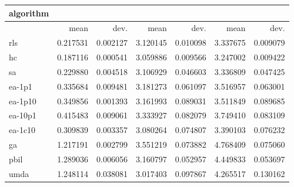 \begin{tabular}{@{}l*{6}{>{{}}N{1}{2}}@{}}
\toprule
{algorithm} &  &  &  \\
\midrule
& {mean} & {dev.} & {mean} & {dev.} & {mean} & {dev.} \\
\midrule
rls & 0.217531 & 0.002127 & 3.120145 & 0.010098 & 3.337675 & 0.009079 \\
 hc & 0.187116 & 0.000541 & 3.059886 & 0.009566 & 3.247002 & 0.009422 \\
 sa & 0.229880 & 0.004518 & 3.106929 & 0.046603 & 3.336809 & 0.047425 \\
 ea-1p1 & 0.335684 & 0.009481 & 3.181273 & 0.061097 & 3.516957 & 0.063001 \\
 ea-1p10 & 0.349856 & 0.001393 & 3.161993 & 0.089031 & 3.511849 & 0.089685 \\
 ea-10p1 & 0.415483 & 0.009061 & 3.333927 & 0.082079 & 3.749410 & 0.083109 \\
 ea-1c10 & 0.309839 & 0.003357 & 3.080264 & 0.074807 & 3.390103 & 0.076232 \\
 ga & 1.217191 & 0.002799 & 3.551219 & 0.073882 & 4.768409 & 0.075060 \\
 pbil & 1.289036 & 0.006056 & 3.160797 & 0.052957 & 4.449833 & 0.053697 \\
 umda & 1.248114 & 0.038081 & 3.017403 & 0.097867 & 4.265517 & 0.130162 \\
 \bottomrule
\end{tabular}
